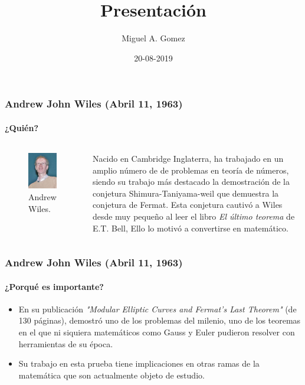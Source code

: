 \documentclass{beamer}
\title{Presentación}
\author{Miguel A. Gomez}
\institute{Fundación Universitaria Konrad Lorenz}
\date{20-08-2019}
\begin{document}
	\begin{frame}
		\frametitle{Andrew John Wiles (Abril 11, 1963)}
		\framesubtitle{¿Quién?}
		\begin{columns}
			\begin{figure}
				\includegraphics[width=0.9\linewidth]{andrew_wiles.jpg}
				\caption{Andrew Wiles.}
				\label{fig:andrew}
			\end{figure}
			
			Nacido en Cambridge Inglaterra, ha trabajado en un amplio número de de problemas en teoría de números, siendo su trabajo más destacado la demostración de la conjetura Shimura-Taniyama-weil que demuestra la conjetura de Fermat. Esta conjetura cautivó a Wiles desde muy pequeño al leer el libro \textit{El último teorema} de E.T. Bell, Ello lo motivó a convertirse en matemático.
		\end{columns}
	\end{frame}
	\begin{frame}
		\frametitle{Andrew John Wiles (Abril 11, 1963)}
		\framesubtitle{¿Porqué es importante?}
		\begin{itemize}
			\item En su publicación \textit{"Modular Elliptic Curves and Fermat’s Last Theorem"} (de 130 páginas), demostró uno de los problemas del milenio, uno de los teoremas en el que ni siquiera matemáticos como Gauss y Euler pudieron resolver con herramientas de su época.
			\item Su trabajo en esta prueba tiene implicaciones en otras ramas de la matemática que son actualmente objeto de estudio.
		\end{itemize}
		
	\end{frame}
\end{document}
